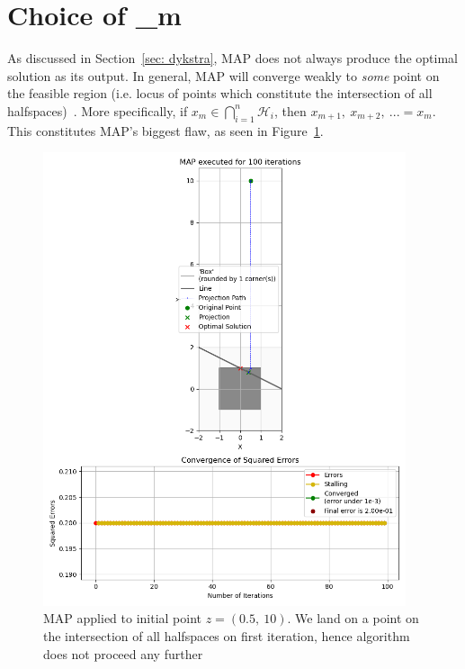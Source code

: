 \documentclass[hidelinks]{article}
\begin{document}
\section{Choice of \beta_m} \label{sec: new algorithm}
%
As discussed in Section~\ref{sec: dykstra}, MAP does not always produce the optimal solution as its output. In general, MAP will converge weakly to \textit{some} point on the feasible region (i.e. locus of points which constitute the intersection of all halfspaces)~\cite{BREGMAN}. More specifically, if $x_m \in \bigcap_{i=1}^n \mathcal{H}_i$, then $x_{m+1},~x_{m+2},~... = x_m$. This constitutes MAP's biggest flaw, as seen in Figure~\ref{fig:MAPterminates}.
%
\begin{figure}[h!]
    \centering
    
    \includegraphics[width=0.95\textwidth]{in_intersection_MAP.png}
    \caption{MAP applied to initial point $z = (0.5,~10)$. We land on a point on the intersection of all halfspaces on first iteration, hence algorithm does not proceed any further}
    \label{fig:MAPterminates}

\end{figure}
\end{document}
